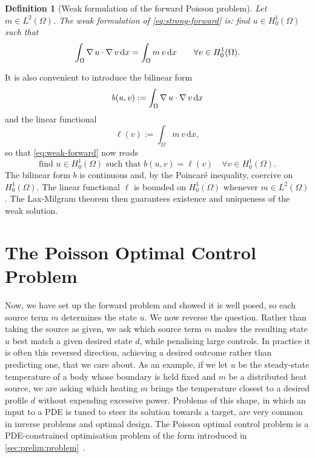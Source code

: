 \documentclass[a4paper,11pt]{article}
\newcommand{\Om}{\Omega}
\newcommand{\Lp}[1]{L^{2}(#1)}              %
\newcommand{\dx}{\,\mathrm{d}x}
\theoremstyle{spacedplain} \newtheorem{theorem}[counter]{Theorem} \newtheorem{lemma}[counter]{Lemma} \newtheorem{prop}[counter]{Proposition} \newtheorem{cor}[counter]{Corollary}
\theoremstyle{spaceddefinition} \newtheorem{defn}[counter]{Definition} \newtheorem{example}[counter]{Example} \newtheorem{remark}[counter]{Remark}
\begin{document}
\begin{defn}[Weak formulation of the forward Poisson problem]
\label{defn:weak-poisson} Let $m \in \Lp{\Om}$. The \emph{weak formulation} of \cref{eq:strong-forward} is: find $u \in H_0^1(\Om)$ such that
\begin{equation}
  \label{eq:weak-forward}
  \int_{\Om} \grad u \cdot \grad v \dx
  = \int_{\Om} m\, v \dx
  \qquad \forall v \in H_0^1(\Om).
\end{equation}
\end{defn}

It is also convenient to introduce the bilinear form
\begin{equation}
  \label{eq:bilinear-b}
  b(u, v) := \int_{\Om} \grad u \cdot \grad v \dx
\end{equation}
and the linear functional
\begin{equation}
  \label{eq:linear-ell}
  \ell(v) := \int_{\Om} m\, v \dx,
\end{equation}
so that \cref{eq:weak-forward} now reads
\begin{equation}
  \label{eq:weak-forward-compact}
  \text{find } u \in H_0^1(\Om) \text{ such that }
  b(u, v) = \ell(v)
  \quad \forall v \in H_0^1(\Om).
\end{equation}
The bilinear form $b$ is continuous and, by the Poincar{\'e} inequality, coercive on $H_0^1(\Om)$. The linear functional $\ell$ is bounded on $H_0^1(\Om)$ whenever $m \in \Lp{\Om}$. The Lax-Milgram theorem then guarantees existence and uniqueness of the weak solution.

\section{The Poisson Optimal Control Problem}
\label{sec:poisson-optimisation}

Now, we have set up the forward problem and showed it is well posed, so each source term $m$ determines the state $u$. We now reverse the question. Rather than taking the source as given, we ask which source term $m$ makes the resulting state $u$ best match a given desired state $d$, while penalising large controls. In practice it is often this reversed direction, achieving a desired outcome rather than predicting one, that we care about. As an example, if we let $u$ be the steady-state temperature of a body whose boundary is held fixed and $m$ be a distributed heat source, we are asking which heating $m$ brings the temperature closest to a desired profile $d$ without expending excessive power. Problems of this shape, in which an input to a PDE is tuned to steer its solution towards a target, are very common in inverse problems and optimal design. The Poisson optimal control problem is a PDE-constrained optimisation problem of the form introduced in \cref{sec:prelim:problem}~\citep{shfp2017}.
\end{document}
